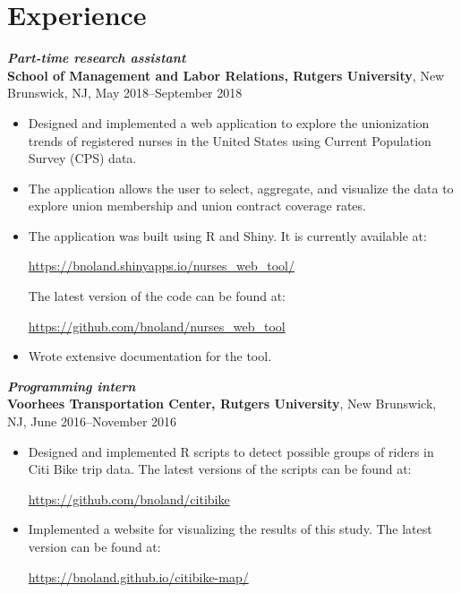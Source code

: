 \documentclass[letterpaper,12pt]{article}
\begin{document}
\section*{Experience}

\textit{\textbf{Part-time research assistant}} \\ \textbf{School of
  Management and Labor Relations, Rutgers University}, New Brunswick,
NJ, May 2018--September 2018
\begin{itemize}
\item Designed and implemented a web application to explore the
  unionization trends of registered nurses in the United States using
  Current Population Survey (CPS) data.
\item The application allows the user to select, aggregate, and
  visualize the data to explore union membership and union contract
  coverage rates.
\item The application was built using R and Shiny. It is currently
  available at:
  \begin{center} \url{https://bnoland.shinyapps.io/nurses_web_tool/}
  \end{center} The latest version of the code can be found at:
  \begin{center} \url{https://github.com/bnoland/nurses_web_tool}
  \end{center}
\item Wrote extensive documentation for the tool.
\end{itemize}

\textit{\textbf{Programming intern}} \\
\textbf{Voorhees Transportation Center, Rutgers University}, New
Brunswick, NJ, June 2016--November 2016
\begin{itemize}
\item Designed and implemented R scripts to detect possible groups of
  riders in Citi Bike trip data. The latest versions of the scripts
  can be found at:
  \begin{center} \url{https://github.com/bnoland/citibike}
\end{center}

\item Implemented a website for visualizing the results of this
  study. The latest version can be found at:
  \begin{center} \url{https://bnoland.github.io/citibike-map/}
\end{center}

\end{itemize}
\end{document}
